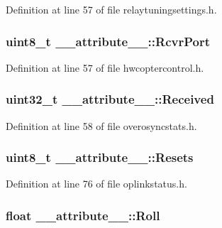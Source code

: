 \-Definition at line 57 of file relaytuningsettings.\-h.

\hypertarget{struct____attribute_____a2251dc31047cff718bcf19c0f393f16b}{
\subsubsection[{\-Rcvr\-Port}]{\setlength{\rightskip}{0pt plus 5cm}uint8\-\_\-t {\bf \-\_\-\-\_\-attribute\-\_\-\-\_\-\-::\-Rcvr\-Port}}}\label{struct____attribute_____a2251dc31047cff718bcf19c0f393f16b}


\-Definition at line 57 of file hwcoptercontrol.\-h.

\hypertarget{struct____attribute_____a55edc408b12148f75db0744e731ce1e4}{
\subsubsection[{\-Received}]{\setlength{\rightskip}{0pt plus 5cm}uint32\-\_\-t {\bf \-\_\-\-\_\-attribute\-\_\-\-\_\-\-::\-Received}}}\label{struct____attribute_____a55edc408b12148f75db0744e731ce1e4}


\-Definition at line 58 of file overosyncstats.\-h.

\hypertarget{struct____attribute_____aa2f35a8f34385baa22dd83ae80313e6a}{
\subsubsection[{\-Resets}]{\setlength{\rightskip}{0pt plus 5cm}uint8\-\_\-t {\bf \-\_\-\-\_\-attribute\-\_\-\-\_\-\-::\-Resets}}}\label{struct____attribute_____aa2f35a8f34385baa22dd83ae80313e6a}


\-Definition at line 76 of file oplinkstatus.\-h.

\hypertarget{struct____attribute_____aa999b9efb942396aa2db4c9d604ecbac}{
\subsubsection[{\-Roll}]{\setlength{\rightskip}{0pt plus 5cm}float {\bf \-\_\-\-\_\-attribute\-\_\-\-\_\-\-::\-Roll}}}\label{struct____attribute_____aa999b9efb942396aa2db4c9d604ecbac}


